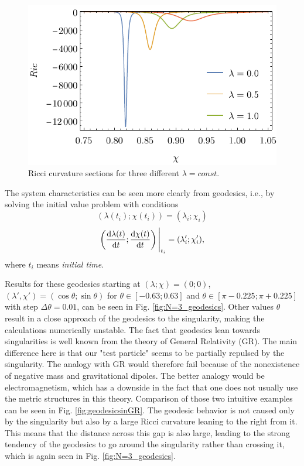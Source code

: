 \begin{figure}[H]
    \centering
    \includegraphics[scale=0.9]{../img/N=3_Ricci_section.pdf}
    \caption{Ricci curvature sections for three different $\lambda=const.$}
    \label{fig:N=3_Ricci_section}
\end{figure}

The system characteristics can be seen more clearly from geodesics, i.e., by solving the initial value problem with conditions
$$(\lambda(t_i);\chi(t_i))=(\lambda_i;\chi_i)$$
$$\left(\frac{\mathrm{d} \lambda(t)}{\mathrm{d} t};\frac{\mathrm{d} \chi(t)}{\mathrm{d} t}\right)\Bigg|_{t_i}=(\lambda'_i;\chi'_i),$$
where $t_i$ means \emph{initial time}.

Results for these geodesics starting at $(\lambda;\chi)=(0;0)$, $(\lambda',\chi')=(\cos\theta;\sin\theta)$ for $\theta\in [-0.63;0.63]$ and $\theta\in [\pi-0.225;\pi+0.225]$ with step $\Delta\theta=0.01$, can be seen in Fig. \ref{fig:N=3_geodesics}. Other values $\theta$ result in a close approach of the geodesics to the singularity, making the calculations numerically unstable. The fact that geodesics lean towards singularities is well known from the theory of General Relativity (GR). The main difference here is that our "test particle" seems to be partially repulsed by the singularity. The analogy with GR would therefore fail because of the nonexistence of negative mass and gravitational dipoles. The better analogy would be electromagnetism, which has a downside in the fact that one does not usually use the metric structures in this theory. Comparison of those two intuitive examples can be seen in Fig. \ref{fig:geodesicsinGR}. The geodesic behavior is not caused only by the singularity but also by a large Ricci curvature leaning to the right from it. This means that the distance across this gap is also large, leading to the strong tendency of the geodesics to go around the singularity rather than crossing it, which is again seen in Fig. \ref{fig:N=3_geodesics}.


